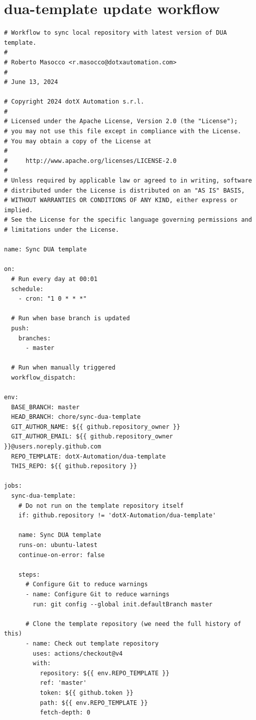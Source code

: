 \chapter{dua-template update workflow}
\label{app:workflow}
\doublespacing
\vspace{-2.5cm}

\begin{center}
\begin{lstlisting}[caption={\texttt{dua-template} update GitHub workflow as of November 22, 2024 \cite{masocco_dua-template_nodate}.}, label={lst:duawf}]
# Workflow to sync local repository with latest version of DUA template.
#
# Roberto Masocco <r.masocco@dotxautomation.com>
#
# June 13, 2024

# Copyright 2024 dotX Automation s.r.l.
#
# Licensed under the Apache License, Version 2.0 (the "License");
# you may not use this file except in compliance with the License.
# You may obtain a copy of the License at
#
#     http://www.apache.org/licenses/LICENSE-2.0
#
# Unless required by applicable law or agreed to in writing, software
# distributed under the License is distributed on an "AS IS" BASIS,
# WITHOUT WARRANTIES OR CONDITIONS OF ANY KIND, either express or implied.
# See the License for the specific language governing permissions and
# limitations under the License.

name: Sync DUA template

on:
  # Run every day at 00:01
  schedule:
    - cron: "1 0 * * *"

  # Run when base branch is updated
  push:
    branches:
      - master

  # Run when manually triggered
  workflow_dispatch:

env:
  BASE_BRANCH: master
  HEAD_BRANCH: chore/sync-dua-template
  GIT_AUTHOR_NAME: ${{ github.repository_owner }}
  GIT_AUTHOR_EMAIL: ${{ github.repository_owner }}@users.noreply.github.com
  REPO_TEMPLATE: dotX-Automation/dua-template
  THIS_REPO: ${{ github.repository }}

jobs:
  sync-dua-template:
    # Do not run on the template repository itself
    if: github.repository != 'dotX-Automation/dua-template'

    name: Sync DUA template
    runs-on: ubuntu-latest
    continue-on-error: false

    steps:
      # Configure Git to reduce warnings
      - name: Configure Git to reduce warnings
        run: git config --global init.defaultBranch master

      # Clone the template repository (we need the full history of this)
      - name: Check out template repository
        uses: actions/checkout@v4
        with:
          repository: ${{ env.REPO_TEMPLATE }}
          ref: 'master'
          token: ${{ github.token }}
          path: ${{ env.REPO_TEMPLATE }}
          fetch-depth: 0


\end{lstlisting}
\end{center}
